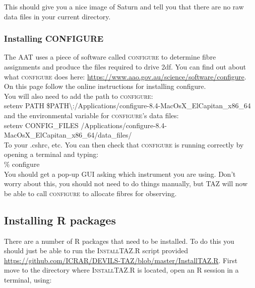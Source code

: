 \documentclass[12pt]{article}
\begin{document}
This should give you a nice image of Saturn and tell you that there are no raw data files in your current directory.

\subsubsection{Installing CONFIGURE}

The AAT uses a piece of software called \textsc{configure} to determine fibre assignments and produce the files required to drive 2df. You can find out about what \textsc{configure} does here: \url{https://www.aao.gov.au/science/software/configure}. On this page follow the online instructions for installing configure.  \\

You will also need to add the path to \textsc{configure}:\\

\hspace{10mm} setenv PATH \$PATH\textbackslash:/Applications/configure-8.4-MacOsX\_ElCapitan\_x86\_64\\

and the environmental variable for \textsc{configure}'s data files:\\

\hspace{10mm}  setenv CONFIG\_FILES /Applications/configure-8.4-MacOsX\_ElCapitan\_x86\_64/data\_files/\\

To your .cshrc, etc.  You can then check that \textsc{configure} is running correctly by opening a terminal and typing: \\

\hspace{10mm} \% configure\\

You should get a pop-up GUI asking which instrument you are using. Don't worry about this, you should not need to do things manually, but \textsc{TAZ} will now be able to call \textsc{configure} to allocate fibres for observing.

\subsection{Installing R packages}

There are a number of R packages that need to be installed. To do this you should just be able to run the \textsc{InstallTAZ.R} script provided \url{https://github.com/ICRAR/DEVILS-TAZ/blob/master/InstallTAZ.R}. First move to the directory where \textsc{InstallTAZ.R} is located, open an R session in a terminal, using:\\
\end{document}
